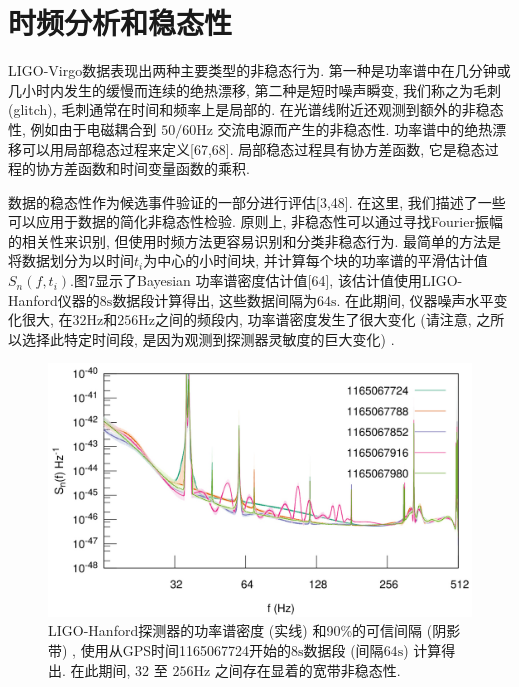 \documentclass[a4paper]{\documentclassname}
\def\t{\text}
\theoremstyle{definition}
\begin{document}
\section{时频分析和稳态性}

LIGO-Virgo数据表现出两种主要类型的非稳态行为. 第一种是功率谱中在几分钟或几小时内发生的缓慢而连续的绝热漂移, 第二种是短时噪声瞬变, 我们称之为毛刺 (glitch), 毛刺通常在时间和频率上是局部的. 在光谱线附近还观测到额外的非稳态性, 例如由于电磁耦合到 $50/60 \t{Hz}$ 交流电源而产生的非稳态性. 功率谱中的绝热漂移可以用局部稳态过程来定义[67,68].  局部稳态过程具有协方差函数, 它是稳态过程的协方差函数和时间变量函数的乘积. 

数据的稳态性作为候选事件验证的一部分进行评估[3,48]. 在这里, 我们描述了一些可以应用于数据的简化非稳态性检验. 原则上, 非稳态性可以通过寻找Fourier振幅的相关性来识别, 但使用时频方法更容易识别和分类非稳态行为. 最简单的方法是将数据划分为以时间$ t_i $为中心的小时间块, 并计算每个块的功率谱的平滑估计值$S_n(f, t_i)$.图7显示了Bayesian 功率谱密度估计值[64], 该估计值使用LIGO-Hanford仪器的$8\t{s}$数据段计算得出, 这些数据间隔为$64\t{s}$. 在此期间, 仪器噪声水平变化很大, 在$32 \t{Hz}$和$256 \t{Hz}$之间的频段内, 功率谱密度发生了很大变化 (请注意, 之所以选择此特定时间段, 是因为观测到探测器灵敏度的巨大变化) . 
\begin{figure}[htbp]
    \centering
    \includegraphics{img/7.jpg}
    \caption{
        LIGO-Hanford探测器的功率谱密度 (实线) 和90\%{}的可信间隔 (阴影带) , 使用从GPS时间1165067724开始的$8\t{s}$数据段 (间隔$64\t{s}$) 计算得出. 在此期间, $32$ 至 $256 \t{Hz}$ 之间存在显着的宽带非稳态性. 
    }
\end{figure}
\end{document}
